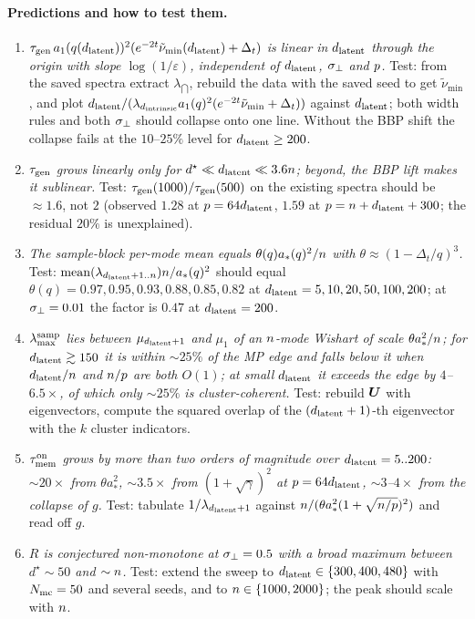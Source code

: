 \paragraph{Predictions and how to test them.}
\begin{enumerate}
\item \emph{$\tau_{\mathrm{gen}}\,a_1(q(d_{\mathrm{latent}}))^2(e^{-2t}\tilde\nu_{\min}(d_{\mathrm{latent}})+\Delta_t)$ is linear in $d_{\mathrm{latent}}$ through the origin with slope $\log(1/\varepsilon)$, independent of $d_{\mathrm{latent}}$, $\sigma_{\perp}$ and $p$.} Test: from the saved spectra extract $\lambda_{\dint}$, rebuild the data with the saved seed to get $\tilde\nu_{\min}$, and plot $d_{\mathrm{latent}}/(\lambda_{d_{\mathrm{intrinsic}}}a_1(q)^2(e^{-2t}\tilde\nu_{\min}+\Delta_t))$ against $d_{\mathrm{latent}}$; both width rules and both $\sigma_{\perp}$ should collapse onto one line. Without the BBP shift the collapse fails at the $10$--$25\%$ level for $d_{\mathrm{latent}}\ge200$.
\item \emph{$\tau_{\mathrm{gen}}$ grows linearly only for $d^\star\ll d_{\mathrm{latent}}\ll3.6n$; beyond, the BBP lift makes it sublinear.} Test: $\tau_{\mathrm{gen}}(1000)/\tau_{\mathrm{gen}}(500)$ on the existing spectra should be $\approx1.6$, not $2$ (observed $1.28$ at $p=64d_{\mathrm{latent}}$, $1.59$ at $p=n+d_{\mathrm{latent}}+300$; the residual $20\%$ is unexplained).
\item \emph{The sample-block per-mode mean equals $\theta(q)a_*(q)^2/n$ with $\theta\approx(1-\Delta_t/q)^3$.} Test: $\operatorname{mean}(\lambda_{d_{\mathrm{latent}}+1..n})n/a_*(q)^2$ should equal $\theta(q)=0.97,0.95,0.93,0.88,0.85,0.82$ at $d_{\mathrm{latent}}=5,10,20,50,100,200$; at $\sigma_{\perp}=0.01$ the factor is $0.47$ at $d_{\mathrm{latent}}=200$.
\item \emph{$\lambda^{\rm samp}_{\max}$ lies between $\mu_{d_{\mathrm{latent}}+1}$ and $\mu_1$ of an $n$-mode Wishart of scale $\theta a_*^2/n$; for $d_{\mathrm{latent}}\gtrsim150$ it is within $\sim25\%$ of the MP edge and falls below it when $d_{\mathrm{latent}}/n$ and $n/p$ are both $O(1)$; at small $d_{\mathrm{latent}}$ it exceeds the edge by $4$--$6.5\times$, of which only $\sim25\%$ is cluster-coherent.} Test: rebuild $\bm{U}$ with eigenvectors, compute the squared overlap of the $(d_{\mathrm{latent}}+1)$-th eigenvector with the $k$ cluster indicators.
\item \emph{$\tau_{\mathrm{mem}}^{\rm on}$ grows by more than two orders of magnitude over $d_{\mathrm{latent}}=5..200$: $\sim20\times$ from $\theta a_*^2$, $\sim3.5\times$ from $(1+\sqrt\gamma)^2$ at $p=64d_{\mathrm{latent}}$, $\sim3$--$4\times$ from the collapse of $g$.} Test: tabulate $1/\lambda_{d_{\mathrm{latent}}+1}$ against $n/(\theta a_*^2(1+\sqrt{n/p})^2)$ and read off $g$.
\item \emph{$R$ is conjectured non-monotone at $\sigma_{\perp}=0.5$ with a broad maximum between $d^\star\sim50$ and $\sim n$.} Test: extend the sweep to $d_{\mathrm{latent}}\in\{300,400,480\}$ with $N_{\rm mc}=50$ and several seeds, and to $n\in\{1000,2000\}$; the peak should scale with $n$.

\end{enumerate}
